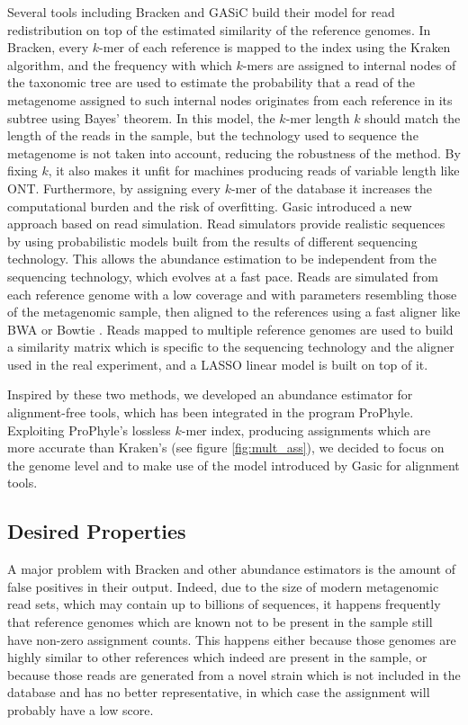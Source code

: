 Several tools including Bracken and GASiC build their model for read redistribution on top of the estimated similarity of the reference genomes. In Bracken, every $k$-mer of each reference is mapped to the index using the Kraken algorithm, and the frequency with which $k$-mers are assigned to internal nodes of the taxonomic tree are used to estimate the probability that a read of the metagenome assigned to such internal nodes originates from each reference in its subtree using Bayes' theorem. In this model, the $k$-mer length $k$ should match the length of the reads in the sample, but the technology used to sequence the metagenome is not taken into account, reducing the robustness of the method. By fixing $k$, it also makes it unfit for machines producing reads of variable length like ONT. Furthermore, by assigning every $k$-mer of the database it increases the computational burden and the risk of overfitting.
Gasic \cite{lindner_metagenomic_2013} introduced a new approach based on read simulation. Read simulators provide realistic sequences by using probabilistic models built from the results of different sequencing technology. This allows the abundance estimation to be independent from the sequencing technology, which evolves at a fast pace. Reads are simulated from each reference genome with a low coverage and with parameters resembling those of the metagenomic sample, then aligned to the references using a fast aligner like BWA \cite{li_aligning_2013} or Bowtie \cite{langmead_fast_2012}. Reads mapped to multiple reference genomes are used to build a similarity matrix which is specific to the sequencing technology and the aligner used in the real experiment, and a LASSO linear model is built on top of it.

Inspired by these two methods, we developed an abundance estimator for alignment-free tools, which has been integrated in the program ProPhyle. Exploiting ProPhyle's lossless $k$-mer index, producing assignments which are more accurate than Kraken's (see figure \ref{fig:mult_ass}), we decided to focus on the genome level and to make use of the model introduced by Gasic for alignment tools.

\subsection{Desired Properties}

A major problem with Bracken and other abundance estimators is the amount of false positives in their output. Indeed, due to the size of modern metagenomic read sets, which may contain up to billions of sequences, it happens frequently that reference genomes which are known not to be present in the sample still have non-zero assignment counts. This happens either because those genomes are highly similar to other references which indeed are present in the sample, or because those reads are generated from a novel strain which is not included in the database and has no better representative, in which case the assignment will probably have a low score.

